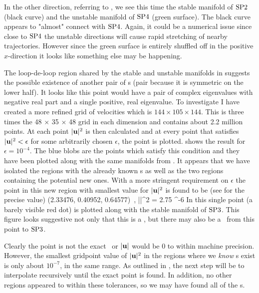   In the other direction, referring to ,
  we see this time the
  stable manifold of ${{\text{SP2}}}$ (black curve)
  and the unstable manifold of ${{\text{SP4}}}$ (green
  surface). The black curve appears to "almost" connect with
  ${{\text{SP4}}}$. Again, it could be a numerical issue since close to ${{\text{SP4}}}$
  the unstable directions will cause rapid stretching of nearby
  trajectories. However since the green surface is entirely shuffled
  off in the positive $x$-direction it looks like something else may
  be happening.

   The loop-de-loop region shared by the stable and
  unstable manifolds in 
  suggests the possible existence of
  another pair of  \stagp s (pair because it is symmetric on the
  lower half). It looks like this point would have a pair of complex eigenvalues
  with negative real part and a single positive, real eigenvalue. To
  investigate I have created a more refined grid of velocities which
  is $144 \times 105 \times 144$. This is three times the 48 $\times$ 35
  $\times$ 48 grid in each dimension and contains about 2.2 million
  points. At each point $|{\bf u}|^{2}$ is then calculated and at
  every point that satisfies $|{\bf u}|^{2} < \epsilon$ for some
  arbitrarily chosen $\epsilon$, the point is plotted.
   shows the
  result for $\epsilon = 10^{-4}$. The blue blobs are the points which satisfy this condition
  and they have been plotted along with the same manifolds from . It appears that we have isolated the
  regions with the already known \stagp s as well as the two
  regions containing the potential new ones. With a more stringent
  requirement on $\epsilon$ the point in this new region with
  smallest value for $|{\bf u}|^{2}$ is found to be
  (see  for the precise value)
  \beq \label{eqn:newsp}
  \bx \simeq (2.33476, 0.40952, 0.64577) \,,\quad
  |\bu|^{2} = 2.75 ^{-6}
  \eeq
  In  this single point (a barely visible red dot)
  is plotted along with the stable manifold
  of ${{\text{SP3}}}$. This figure looks suggestive not only that this is a
  \stagp, but there may also be a \hec\ from this point
  to ${{\text{SP3}}}$.

  Clearly the point  is not the exact \stagp\ or
  $|{\bf u}|$ would be 0 to within machine precision. However,
  the smallest gridpoint value of $|{\bf u}|^{2}$ in the regions
  where we \emph{know} \stagp s exist is only about $10^{-7}$, in the
  same range. As outlined in , the next step will be to
  interpolate recursively until the exact point is found. In
  addition, no other regions appeared to within these tolerances, so
  we may have found all of the \stagp s.

